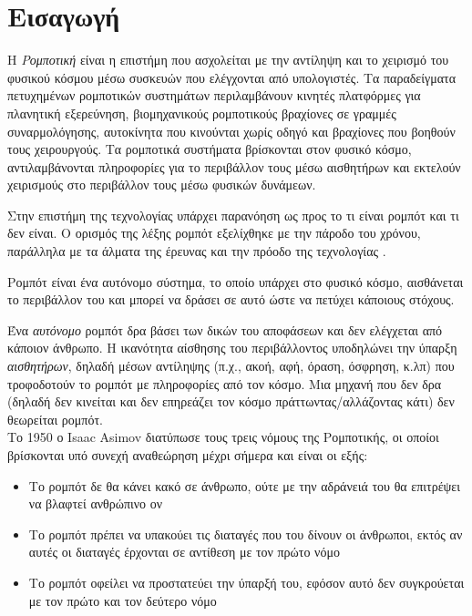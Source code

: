 \chapter{Εισαγωγή}
\label{chapter:intro}

Η \emph{Ρομποτική} είναι η επιστήμη που ασχολείται με την αντίληψη και το χειρισμό του φυσικού κόσμου μέσω συσκευών που ελέγχονται από υπολογιστές. Τα παραδείγματα πετυχημένων ρομποτικών συστημάτων περιλαμβάνουν κινητές πλατφόρμες για πλανητική εξερεύνηση, βιομηχανικούς ρομποτικούς βραχίονες σε γραμμές συναρμολόγησης, αυτοκίνητα που κινούνται χωρίς οδηγό και βραχίονες που βοηθούν τους χειρουργούς. Τα ρομποτικά συστήματα βρίσκονται στον φυσικό κόσμο, αντιλαμβάνονται πληροφορίες για το περιβάλλον τους μέσω αισθητήρων και εκτελούν χειρισμούς στο περιβάλλον τους μέσω φυσικών δυνάμεων.

Στην επιστήμη της τεχνολογίας υπάρχει παρανόηση ως προς το τι είναι ρομπότ και τι δεν είναι. Ο ορισμός της λέξης ρομπότ εξελίχθηκε με την πάροδο του χρόνου, παράλληλα με τα άλματα της έρευνας και την πρόοδο της τεχνολογίας \cite{mataric2007}.
\begin{displayquote}
    Ρομπότ είναι ένα αυτόνομο σύστημα, το οποίο υπάρχει στο φυσικό κόσμο, αισθάνεται το περιβάλλον του και μπορεί να δράσει σε αυτό ώστε να πετύχει κάποιους στόχους. 
\end{displayquote}

Ένα \emph{αυτόνομο} ρομπότ δρα βάσει των δικών του αποφάσεων και δεν ελέγχεται από κάποιον άνθρωπο. Η ικανότητα αίσθησης του περιβάλλοντος υποδηλώνει την ύπαρξη \emph{αισθητήρων}, δηλαδή μέσων αντίληψης (π.χ., ακοή, αφή, όραση, όσφρηση, κ.λπ) που τροφοδοτούν το ρομπότ με πληροφορίες από τον κόσμο. Μια μηχανή που δεν δρα (δηλαδή δεν κινείται και δεν επηρεάζει τον κόσμο πράττωντας/αλλάζοντας κάτι) δεν θεωρείται ρομπότ. \\

Το 1950 ο Isaac Asimov διατύπωσε τους τρεις νόμους της Ρομποτικής, οι οποίοι βρίσκονται υπό συνεχή αναθεώρηση μέχρι σήμερα \cite{mccauley2007} και είναι οι εξής:
\begin{displayquote}
 \begin{itemize}
  \item{Το ρομπότ δε θα κάνει κακό σε άνθρωπο, ούτε με την αδράνειά του θα επιτρέψει να βλαφτεί ανθρώπινο ον}
  \item{Το ρομπότ πρέπει να υπακούει τις διαταγές που του δίνουν οι άνθρωποι, εκτός αν αυτές οι διαταγές έρχονται σε αντίθεση με τον πρώτο νόμο}
  \item{Το ρομπότ οφείλει να προστατεύει την ύπαρξή του, εφόσον αυτό δεν συγκρούεται με τον πρώτο και τον δεύτερο νόμο}
\end{itemize}

\end{displayquote}





